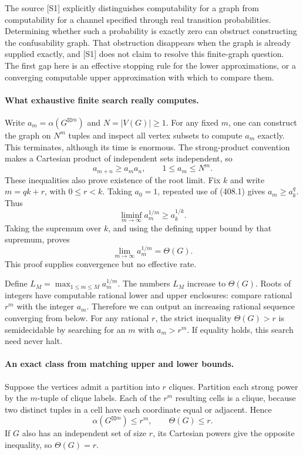 \documentclass[11pt]{article}
\begin{document}
The source [S1] explicitly distinguishes computability for a graph from computability for a channel specified through real transition probabilities. Determining whether such a probability is exactly zero can obstruct constructing the confusability graph. That obstruction disappears when the graph is already supplied exactly, and [S1] does not claim to resolve this finite-graph question. The first gap here is an effective stopping rule for the lower approximations, or a converging computable upper approximation with which to compare them.

\paragraph{What exhaustive finite search really computes.}
Write $a_m=\alpha(G^{\boxtimes m})$ and $N=|V(G)|\ge1$. For any fixed $m$, one can construct the graph on $N^m$ tuples and inspect all vertex subsets to compute $a_m$ exactly. This terminates, although its time is enormous. The strong-product convention makes a Cartesian product of independent sets independent, so
\[
 a_{m+n}\ge a_ma_n,\qquad 1\le a_m\le N^m.
 \tag{408.1}
\]
These inequalities also prove existence of the root limit. Fix $k$ and write $m=qk+r$, with $0\le r<k$. Taking $a_0=1$, repeated use of (408.1) gives $a_m\ge a_k^q$. Thus
\[
 \liminf_{m\to\infty}a_m^{1/m}\ge a_k^{1/k}.
\]
Taking the supremum over $k$, and using the defining upper bound by that supremum, proves
\[
 \lim_{m\to\infty}a_m^{1/m}=\Theta(G).
\]
This proof supplies convergence but no effective rate.

Define $L_M=\max_{1\le m\le M}a_m^{1/m}$. The numbers $L_M$ increase to $\Theta(G)$. Roots of integers have computable rational lower and upper enclosures: compare rational $r^m$ with the integer $a_m$. Therefore we can output an increasing rational sequence converging from below. For any rational $r$, the strict inequality $\Theta(G)>r$ is semidecidable by searching for an $m$ with $a_m>r^m$. If equality holds, this search need never halt.

\paragraph{An exact class from matching upper and lower bounds.}
Suppose the vertices admit a partition into $r$ cliques. Partition each strong power by the $m$-tuple of clique labels. Each of the $r^m$ resulting cells is a clique, because two distinct tuples in a cell have each coordinate equal or adjacent. Hence
\[
 \alpha(G^{\boxtimes m})\le r^m,\qquad \Theta(G)\le r.
\]
If $G$ also has an independent set of size $r$, its Cartesian powers give the opposite inequality, so $\Theta(G)=r$.
\end{document}
